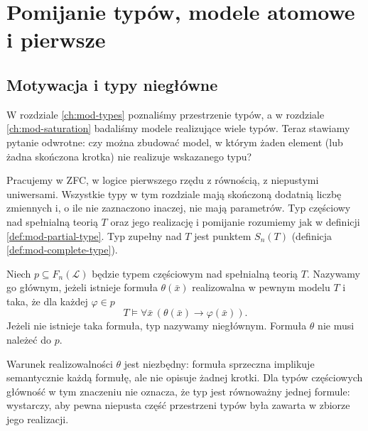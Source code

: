 \chapter{Pomijanie typów, modele atomowe i pierwsze}
\label{ch:mod-omitting-types}
\section{Motywacja i typy niegłówne}
W rozdziale \ref{ch:mod-types} poznaliśmy przestrzenie
typów, a w rozdziale \ref{ch:mod-saturation} badaliśmy
modele realizujące wiele typów. Teraz stawiamy pytanie
odwrotne: czy można zbudować model, w którym żaden
element (lub żadna skończona krotka) nie realizuje
wskazanego typu?

Pracujemy w ZFC, w logice pierwszego rzędu z równością,
z niepustymi uniwersami. Wszystkie typy w tym rozdziale
mają skończoną dodatnią liczbę zmiennych i, o ile nie
zaznaczono inaczej, nie mają parametrów. Typ częściowy
nad spełnialną teorią $T$ oraz jego realizację
i pomijanie rozumiemy jak w definicji
\ref{def:mod-partial-type}. Typ zupełny nad $T$
jest punktem $S_n(T)$ (definicja
\ref{def:mod-complete-type}).

\begin{definicja}
\label{def:mod-ott-principal}
Niech $p\subseteq F_n(\mathcal L)$ będzie typem
częściowym nad spełnialną teorią $T$.
Nazywamy go głównym, jeżeli istnieje formuła
$\theta(\bar x)$ realizowalna w pewnym modelu $T$
i taka, że dla każdej $\varphi\in p$
\[
T\models\forall\bar x\,(\theta(\bar x)\to\varphi(\bar x)).
\]
Jeżeli nie istnieje taka formuła, typ nazywamy
niegłównym. Formuła $\theta$ nie musi należeć do $p$.
\end{definicja}

Warunek realizowalności $\theta$ jest niezbędny:
formuła sprzeczna implikuje semantycznie każdą
formułę, ale nie opisuje żadnej krotki.
Dla typów częściowych główność w tym znaczeniu
nie oznacza, że typ jest równoważny jednej formule:
wystarczy, aby pewna niepusta część przestrzeni
typów była zawarta w zbiorze jego realizacji.

